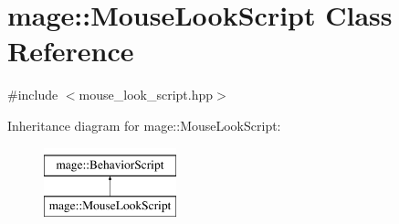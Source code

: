 \hypertarget{classmage_1_1_mouse_look_script}{}\section{mage\+:\+:Mouse\+Look\+Script Class Reference}
\label{classmage_1_1_mouse_look_script}


{\ttfamily \#include $<$mouse\+\_\+look\+\_\+script.\+hpp$>$}

Inheritance diagram for mage\+:\+:Mouse\+Look\+Script\+:\begin{figure}[H]
\begin{center}
\leavevmode
\includegraphics[height=2.000000cm]{classmage_1_1_mouse_look_script}
\end{center}
\end{figure}

